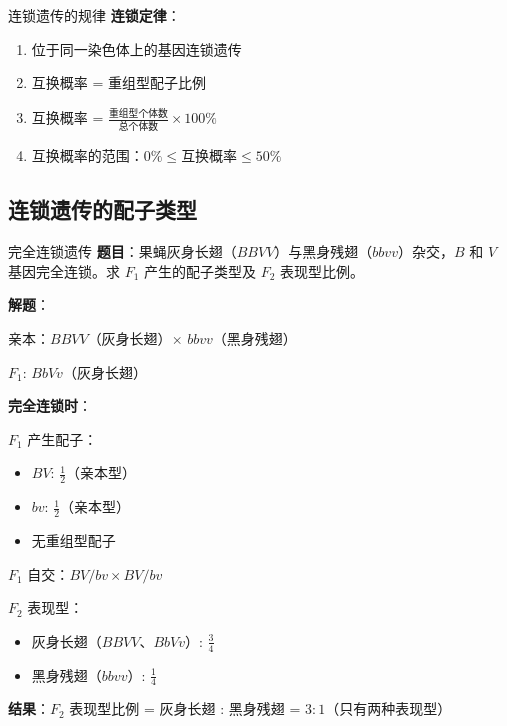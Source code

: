 \documentclass[a4paper,11pt]{ctexart}
\begin{document}
\begin{theorembox}{连锁遗传的规律}
\textbf{连锁定律}：
\begin{enumerate}[leftmargin=2em]
    \item 位于同一染色体上的基因连锁遗传
    \item 互换概率 = 重组型配子比例
    \item 互换概率 = $\frac{\text{重组型个体数}}{\text{总个体数}} \times 100\%$
    \item 互换概率的范围：$0\% \leq \text{互换概率} \leq 50\%$
\end{enumerate}
\end{theorembox}

\subsection{连锁遗传的配子类型}

\begin{examplebox}{完全连锁遗传}
\textbf{题目}：果蝇灰身长翅（$BBVV$）与黑身残翅（$bbvv$）杂交，$B$ 和 $V$ 基因完全连锁。求 $F_1$ 产生的配子类型及 $F_2$ 表现型比例。

\textbf{解题}：

亲本：$BBVV$（灰身长翅）$\times$ $bbvv$（黑身残翅）

$F_1$: $BbVv$（灰身长翅）

\textbf{完全连锁时}：

$F_1$ 产生配子：
\begin{itemize}[leftmargin=2em]
    \item $BV$: $\frac{1}{2}$（亲本型）
    \item $bv$: $\frac{1}{2}$（亲本型）
    \item 无重组型配子
\end{itemize}

$F_1$ 自交：$BV/bv \times BV/bv$

$F_2$ 表现型：
\begin{itemize}[leftmargin=2em]
    \item 灰身长翅（$BBVV$、$BbVv$）: $\frac{3}{4}$
    \item 黑身残翅（$bbvv$）: $\frac{1}{4}$
\end{itemize}

\textbf{结果}：$F_2$ 表现型比例 = 灰身长翅 : 黑身残翅 = $3:1$（只有两种表现型）
\end{examplebox}
\end{document}
